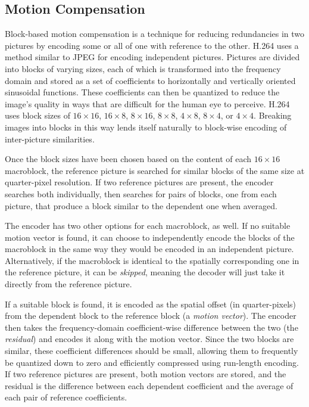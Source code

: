 \documentclass{sig-alternate-05-2015}
\begin{document}
\subsection{Motion Compensation}
\label{subsec:motion}

Block-based motion compensation is a technique for reducing redundancies in two
pictures by encoding some or all of one with reference to the other. H.264 uses
a method similar to JPEG for encoding independent pictures. Pictures are divided
into blocks of varying sizes, each of which is transformed into the frequency
domain and stored as a set of coefficients to horizontally and vertically
oriented sinusoidal functions. These coefficients can then be quantized
to reduce the image's quality in ways that are difficult for the human eye to
perceive. H.264 uses block sizes of $16\times 16$, $16\times 8$,
$8\times 16$, $8\times 8$, $4\times 8$, $8\times 4$, or $4\times 4$. Breaking
images into blocks in this way lends itself naturally to block-wise encoding
of inter-picture similarities.

Once the block sizes have been chosen based on the content of each
$16\times 16$ macroblock, the reference picture is searched for similar
blocks of the same size at quarter-pixel resolution. If two reference
pictures are present, the encoder searches both individually, then searches
for pairs of blocks, one from each picture, that produce a block similar to
the dependent one when averaged.

The encoder has two other options for each macroblock, as well. If no
suitable motion vector is found, it can choose to independently encode the
blocks of the macroblock in the same way they would be encoded in an
independent picture. Alternatively, if the macroblock is identical to the
spatially corresponding one in the reference picture, it can be
{\it skipped}, meaning the decoder will just take it directly from the
reference picture.

If a suitable block is found, it is encoded as the spatial offset (in
quarter-pixels) from the dependent block to the reference block (a
{\it motion vector}). The encoder then takes the frequency-domain
coefficient-wise difference between the two (the {\it residual}) and encodes
it along with the motion vector. Since the two blocks are similar, these
coefficient differences should be small, allowing them to frequently be
quantized down to zero and efficiently compressed using run-length encoding.
If two reference pictures are present, both motion vectors are stored, and
the residual is the difference between each dependent coefficient and the
average of each pair of reference coefficients.
\end{document}
